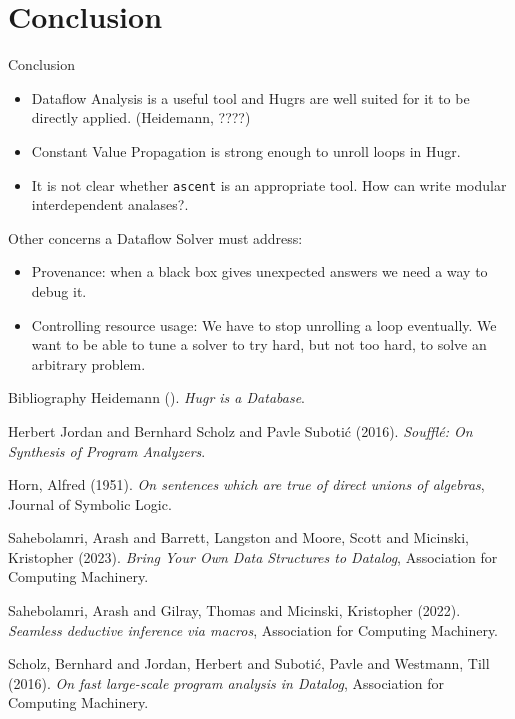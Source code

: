 \documentclass[presentation]{beamer}
\begin{document}
\section{Conclusion}
\label{sec:org40da867}
\begin{frame}[label={sec:orgf3af976},fragile]{Conclusion}
 \begin{itemize}
\item Dataflow Analysis is a useful tool and Hugrs are well suited for it to be
directly applied. (Heidemann, ????)
\item Constant Value Propagation is strong enough to unroll loops in Hugr.
\item It is not clear whether \texttt{ascent} is an appropriate tool. How can write modular interdependent analases?.
\end{itemize}

Other concerns a Dataflow Solver must address:
\begin{itemize}
\item Provenance: when a black box gives unexpected answers we need a way to debug it.
\item Controlling resource usage: We have to stop unrolling a loop eventually. We want to be able to tune a solver to try hard, but not too hard, to solve an arbitrary problem.
\end{itemize}
\end{frame}
\begin{frame}[fragile,allowframebreaks,label=]{Bibliography}
\noindent
Heidemann (). \emph{Hugr is a Database}.

\noindent
Herbert Jordan and Bernhard Scholz and Pavle Suboti{\'c} (2016). \emph{Souffl{\'e}: On Synthesis of Program Analyzers}.

\noindent
Horn, Alfred (1951). \emph{On sentences which are true of direct unions of algebras}, Journal of Symbolic Logic.

\noindent
Sahebolamri, Arash and Barrett, Langston and Moore, Scott and Micinski, Kristopher (2023). \emph{Bring Your Own Data Structures to Datalog}, Association for Computing Machinery.

\noindent
Sahebolamri, Arash and Gilray, Thomas and Micinski, Kristopher (2022). \emph{Seamless deductive inference via macros}, Association for Computing Machinery.

\noindent
Scholz, Bernhard and Jordan, Herbert and Suboti\'{c}, Pavle and Westmann, Till (2016). \emph{On fast large-scale program analysis in Datalog}, Association for Computing Machinery.
\end{frame}
\end{document}

